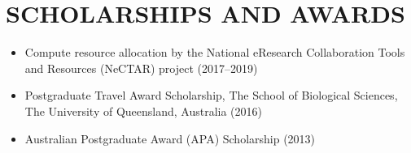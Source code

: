 \documentclass[12pt,a4paper]{article}
\begin{document}
\section*{SCHOLARSHIPS AND AWARDS}
\begin{itemize}

\item Compute resource allocation by the National eResearch Collaboration Tools and Resources (NeCTAR) project (2017--2019)

\item Postgraduate Travel Award Scholarship, The School of Biological Sciences, The University of Queensland, Australia (2016)

\item Australian Postgraduate Award (APA) Scholarship (2013)

\end{itemize}
\end{document}

